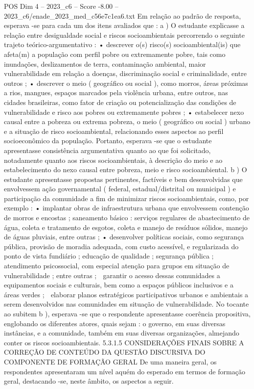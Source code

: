 \begin{textsample}{POS Dim 4 – 2023\_c6 – Score -8.00 – 2023\_c6/enade\_2023\_med\_c56e7c1ea6.txt}
Em relação ao padrão de resposta, esperava -se para cada um dos itens avaliados que : a ) O estudante explicasse a relação entre desigualdade social e riscos socioambientais percorrendo o seguinte trajeto teórico-argumentativo : • descrever o(s) risco(s) socioambiental(is) que afeta(m) a população com perfil pobre ou extremamente pobre, tais como inundações, deslizamentos de terra, contaminação ambiental, maior vulnerabilidade em relação a doenças, discriminação social e criminalidade, entre outros ; • descrever o meio ( geográfico ou social ), como morros, áreas próximas a rios, mangues, espaços marcados pela violência urbana, entre outros, nas cidades brasileiras, como fator de criação ou potencialização das condições de vulnerabilidade e risco aos pobres ou extremamente pobres ; • estabelecer nexo causal entre a pobreza ou extrema pobreza, o meio ( geográfico ou social ) urbano e a situação de risco socioambiental, relacionando esses aspectos ao perfil socioeconômico da população.
Portanto, esperava -se que o estudante apresentasse consistência argumentativa quanto ao que foi solicitado, notadamente quanto aos riscos socioambientais, à descrição do meio e ao estabelecimento do nexo causal entre pobreza, meio e risco socioambiental. b ) O estudante apresentasse propostas pertinentes, factíveis e bem desenvolvidas que envolvessem ação governamental ( federal, estadual/distrital ou municipal ) e participação da comunidade a fim de minimizar riscos socioambientais, como, por exemplo : • implantar obras de infraestrutura urbana que envolvessem contenção de morros e encostas ; saneamento básico : serviços regulares de abastecimento de água, coleta e tratamento de esgotos, coleta e manejo de resíduos sólidos, manejo de águas pluviais, entre outras ; • desenvolver políticas sociais, como segurança pública, provisão de moradia adequada, com custo acessível, e regularizada do ponto de vista fundiário ; educação de qualidade ; segurança pública ; atendimento psicossocial, com especial atenção para grupos em situação de vulnerabilidade ; entre outras ;  garantir o acesso dessas comunidades a equipamentos sociais e culturais, bem como a espaços públicos inclusivos e a áreas verdes ;  elaborar planos estratégicos participativos urbanos e ambientais a serem desenvolvidos nas comunidades em situação de vulnerabilidade.
No tocante ao subitem b ), esperava -se que o respondente apresentasse coerência propositiva, englobando os diferentes atores, quais sejam : o governo, em suas diversas instâncias, e a comunidade, também em suas diversas organizações, almejando conter os riscos socioambientais. 5.3.1.5 CONSIDERAÇÕES FINAIS SOBRE A CORREÇÃO DE CONTEÚDO DA QUESTÃO DISCURSIVA DO COMPONENTE DE FORMAÇÃO GERAL De uma maneira geral, os respondentes apresentaram um nível aquém do esperado em termos de formação geral, destacando -se, neste âmbito, os aspectos a seguir.

\end{textsample}
